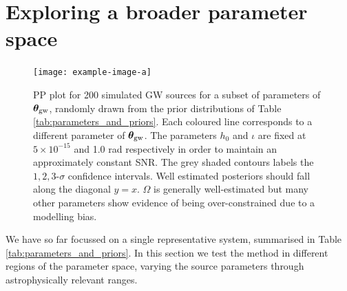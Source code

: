 \documentclass[fleqn,usenatbib,useAMS]{mnras}
\begin{document}
\section{Exploring a broader parameter space} \label{sec:parameter_space}
\begin{figure}
	\centering
	\texttt{[image: example-image-a]}
	\caption{PP plot for 200 simulated GW sources for a subset of parameters of $\boldsymbol{\theta}_{\rm gw}$, randomly drawn from the prior distributions of Table \ref{tab:parameters_and_priors}. Each coloured line corresponds to a different parameter of $\boldsymbol{\theta}_{\rm gw}$. The parameters $h_0$ and $\iota$ are fixed at $5 \times 10^{-15}$ and 1.0 rad respectively in order to maintain an approximately constant SNR. The grey shaded contours labels the $1,2,3$-$\sigma$ confidence intervals. Well estimated posteriors should fall along the diagonal $y=x$. $\Omega$ is generally well-estimated but many other parameters show evidence of being over-constrained due to a modelling bias. }
	\label{fig:parameter_space}
\end{figure}
We have so far focussed on a single representative system, summarised in Table \ref{tab:parameters_and_priors}. In this section we test the method in different regions of the parameter space, varying the source parameters through astrophysically relevant ranges. \newline 
\end{document}
